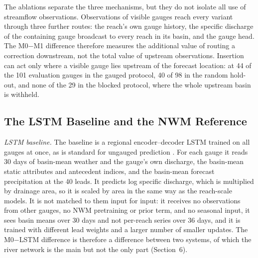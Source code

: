 \documentclass[draft]{agujournal2019}
\begin{document}
The ablations separate the three mechanisms, but they do not isolate all use of streamflow observations. Observations of visible gauges reach every variant through three further routes: the reach's own gauge history, the specific discharge of the containing gauge broadcast to every reach in its basin, and the gauge head. The M0$-$M1 difference therefore measures the additional value of routing a correction downstream, not the total value of upstream observations. Insertion can act only where a visible gauge lies upstream of the forecast location: at 44 of the 101 evaluation gauges in the gauged protocol, 40 of 98 in the random hold-out, and none of the 29 in the blocked protocol, where the whole upstream basin is withheld.

\subsection{The LSTM Baseline and the NWM Reference}
\label{sec:baselines}

\textit{LSTM baseline.} The baseline is a regional encoder--decoder LSTM trained on all gauges at once, as is standard for ungauged prediction \cite{Kratzert2019wrr}. For each gauge it reads 30 days of basin-mean weather and the gauge's own discharge, the basin-mean static attributes and antecedent indices, and the basin-mean forecast precipitation at the 40 leads. It predicts log specific discharge, which is multiplied by drainage area, so it is scaled by area in the same way as the reach-scale models. It is not matched to them input for input: it receives no observations from other gauges, no NWM pretraining or prior term, and no seasonal input, it sees basin means over 30 days and not per-reach series over 36 days, and it is trained with different lead weights and a larger number of smaller updates. The M0$-$LSTM difference is therefore a difference between two systems, of which the river network is the main but not the only part (Section~6).
\end{document}
